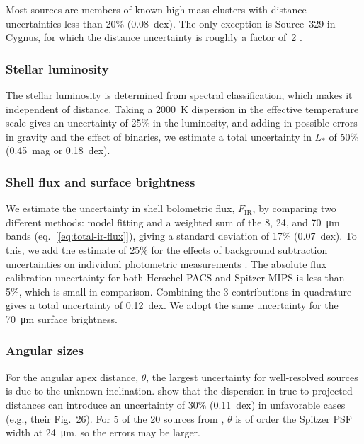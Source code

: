 Most sources are members of known high-mass clusters with distance
uncertainties less than 20\% (0.08~dex). The only exception is
Source~329 in Cygnus, for which the distance uncertainty is roughly a
factor of~2 \citep{Kobulnicky:2018a}.

\subsubsection{Stellar luminosity}
\label{sec:stellar-luminosity}

The stellar luminosity is determined from spectral classification,
which makes it independent of distance.  Taking a \SI{2000}{K}
dispersion in the effective temperature scale \citep{Martins:2005a}
gives an uncertainty of 25\% in the luminosity, and adding in possible
errors in gravity and the effect of binaries, we estimate a total
uncertainty in \(L_*\) of 50\% (0.45~mag or 0.18~dex).

\subsubsection{Shell flux and surface brightness}
\label{sec:shell-flux-surface}

We estimate the uncertainty in shell bolometric flux,
\(F_{\text{IR}}\), by comparing two different methods: model fitting
\citep{Kobulnicky:2017a} and a weighted sum of the 8, 24, and
\SI{70}{\um} bands (eq.~[\ref{eq:total-ir-flux}]), giving a standard
deviation of 17\% (0.07~dex).  To this, we add the estimate of 25\%
for the effects of background subtraction uncertainties on individual
photometric measurements \citep{Kobulnicky:2017a}. The absolute flux
calibration uncertainty for both Herschel PACS \citep{Balog:2014a} and
Spitzer MIPS \citep{Engelbracht:2007a} is less than 5\%, which is
small in comparison. Combining the 3 contributions in quadrature gives
a total uncertainty of 0.12~dex.  We adopt the same uncertainty for
the \SI{70}{\um} surface brightness.

\subsubsection{Angular sizes}
\label{sec:angular-sizes}

For the angular apex distance, \(\theta\), the largest uncertainty for
well-resolved sources is due to the unknown inclination.
\citet{Tarango-Yong:2018a} show that the dispersion in true to
projected distances can introduce an uncertainty of \(30\%\)
(0.11~dex) in unfavorable cases (e.g., their Fig.~26).  For 5 of the
20 sources from \citet{Kobulnicky:2018a}, \(\theta\) is of order the
Spitzer PSF width at \SI{24}{\um}, so the errors may be larger.


